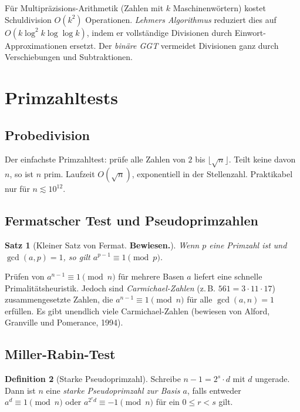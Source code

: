 \documentclass[12pt,a4paper]{amsart}
\newtheorem{theorem}{Satz}[section]
\theoremstyle{definition}
\newtheorem{definition}[theorem]{Definition}
\begin{document}
Für Multipräzisions-Arithmetik (Zahlen mit $k$ Maschinenwörtern) kostet
Schuldivision $O(k^2)$ Operationen. \emph{Lehmers Algorithmus} reduziert dies
auf $O(k\log^2 k \log\log k)$, indem er vollständige Divisionen durch
Einwort-Approximationen ersetzt. Der \emph{binäre GGT} vermeidet Divisionen
ganz durch Verschiebungen und Subtraktionen.

\section{Primzahltests}

\subsection{Probedivision}

Der einfachste Primzahltest: prüfe alle Zahlen von $2$ bis $\lfloor\sqrt{n}\rfloor$.
Teilt keine davon $n$, so ist $n$ prim. Laufzeit $O(\sqrt{n})$, exponentiell in
der Stellenzahl. Praktikabel nur für $n \lesssim 10^{12}$.

\subsection{Fermatscher Test und Pseudoprimzahlen}

\begin{theorem}[Kleiner Satz von Fermat. \textbf{Bewiesen.}]
Wenn $p$ eine Primzahl ist und $\gcd(a,p)=1$, so gilt $a^{p-1} \equiv 1 \pmod{p}$.
\end{theorem}

Prüfen von $a^{n-1} \equiv 1 \pmod{n}$ für mehrere Basen $a$ liefert eine
schnelle Primalitätsheuristik. Jedoch sind \emph{Carmichael-Zahlen} (z.\,B.
$561 = 3\cdot 11\cdot 17$) zusammengesetzte Zahlen, die $a^{n-1}\equiv 1\pmod{n}$
für alle $\gcd(a,n)=1$ erfüllen. Es gibt unendlich viele Carmichael-Zahlen
(bewiesen von Alford, Granville und Pomerance, 1994).

\subsection{Miller-Rabin-Test}

\begin{definition}[Starke Pseudoprimzahl]
Schreibe $n-1 = 2^s \cdot d$ mit $d$ ungerade. Dann ist $n$ eine
\emph{starke Pseudoprimzahl zur Basis $a$}, falls entweder
$a^d \equiv 1 \pmod{n}$ oder $a^{2^r d} \equiv -1 \pmod{n}$ für ein
$0 \le r < s$ gilt.
\end{definition}
\end{document}

